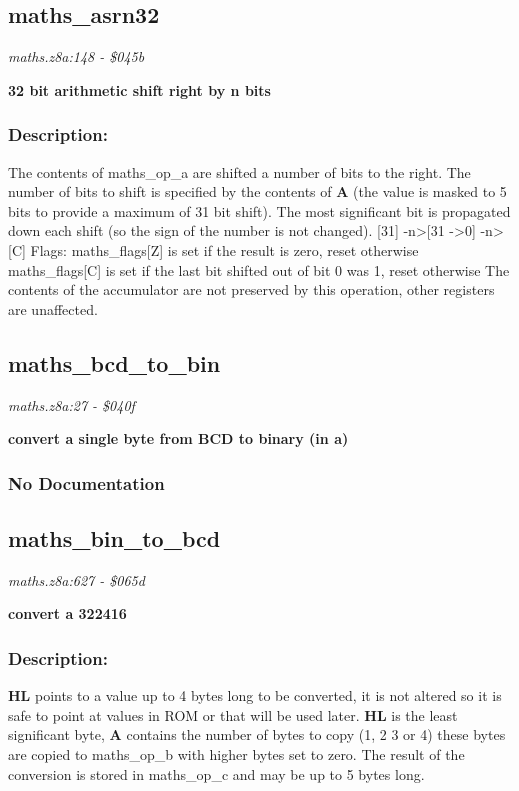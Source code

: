 \subsection{maths\_asrn32}
\textit{maths.z8a:148 - \$045b}

\noindent
\textbf{32 bit arithmetic shift right by n bits}

\subsubsection{Description:}
 The contents of maths\_op\_a are shifted a number of bits to the right.  The number of bits to shift is specified by the contents of \textbf{A} (the value is masked to 5 bits to provide a maximum of 31 bit shift).  The most significant bit is propagated down each shift (so the sign of the number is not changed).  [31] -n\textgreater  [31 -\textgreater  0] -n\textgreater  [C] Flags:  maths\_flags[Z] is set if the result is zero, reset otherwise  maths\_flags[C] is set if the last bit shifted out of bit 0 was 1, reset  otherwise The contents of the accumulator are not preserved by this operation, other registers are unaffected.

\subsection{maths\_bcd\_to\_bin}
\textit{maths.z8a:27 - \$040f}

\noindent
\textbf{convert a single byte from BCD to binary (in a)}

\subsubsection{No Documentation}


\subsection{maths\_bin\_to\_bcd}
\textit{maths.z8a:627 - \$065d}

\noindent
\textbf{convert a 322416}

\subsubsection{Description:}
 \textbf{HL} points to a value up to 4 bytes long to be converted, it is not altered so it is safe to point at values in ROM or that will be used later.  \textbf{HL} is the least significant byte, \textbf{A} contains the number of bytes to copy (1, 2 3 or 4) these bytes are copied to maths\_op\_b with higher bytes set to zero. The result of the conversion is stored in maths\_op\_c and may be up to 5 bytes long.

